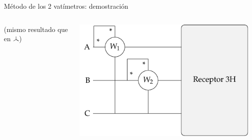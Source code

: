 \documentclass[aspectratio=169, usenames,svgnames,dvipsnames]{beamer}
\newcommand\wye{\scalerel*{\stackengine{-1pt}{%
  \rotatebox[origin=c]{30}{\rule{10pt}{.9pt}}\kern-1pt%
  \rotatebox[origin=c]{-30}{\rule{10pt}{1.3pt}}}{%
  \rule{.9pt}{10pt}}{O}{c}{F}{F}{S}}{\Delta}} %
\begin{document}
\begin{frame}{Método de los 2 vatímetros: \hspace{3mm}demostración}
\begin{columns}
\begin{column}{0.6\linewidth}
        \centering
        \small{(\alert{mismo resultado} que en $\wye$)}
	\end{column}
 
	\begin{column}{0.4\linewidth}

        \vspace*{13mm}
        
        \hspace*{-8mm}
        \includegraphics[width=1.1\linewidth]{../figs/Potencia3H.pdf}
	\end{column}
	\end{columns}
\end{frame}

\end{document}
